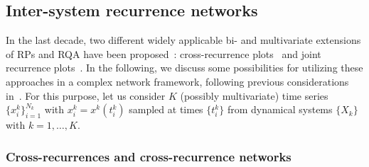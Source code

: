 \documentclass[graybox]{svmult}
\begin{document}
\subsection{Inter-system recurrence networks}\label{sec:irn}

In the last decade, two different widely applicable bi- and multivariate extensions of RPs and RQA have been proposed~\cite{marwan2007}: cross-recurrence plots~\cite{Marwan2002PLA,Zbilut1998} and joint recurrence plots~\cite{Romano2004PLA}. In the following, we discuss some possibilities for utilizing these approaches in a complex network framework, following previous considerations in~\cite{Feldhoff2011,Feldhoff2012,Feldhoff2013}. For this purpose, let us consider $K$ (possibly multivariate) time series $\{x_i^k\}_{i=1}^{N_k}$ with $x_i^k=x^k(t^k_i)$ sampled at times $\{t^k_i\}$ from dynamical systems $\{X_k\}$ with $k=1,\dots,K$. 



\subsubsection{Cross-recurrences and cross-recurrence networks}\label{sec:crn_idea}
\end{document}
